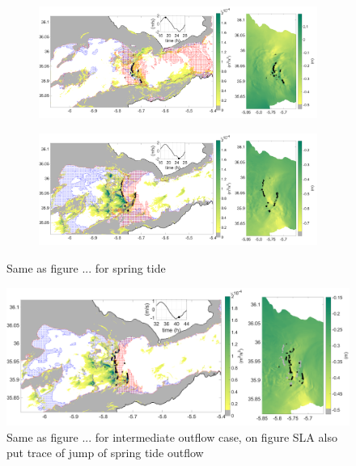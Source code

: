 \begin{figure}[!h]
 \centering
\begin{subfigure}{\linewidth}
\centering
\includegraphics[width=\linewidth]{./GBR3D/VE2_18h30_p.png}
\end{subfigure}

\begin{subfigure}{\linewidth}
\centering
\includegraphics[width=\linewidth]{./GBR3D/VE2_25h_p.png}
\end{subfigure}
\caption {Same as figure ... for spring tide}
\end{figure}

\begin{figure}[!h]
 \centering
\includegraphics[width=\linewidth]{./GBR3D/IES_41h_p.png}
 \caption {Same as figure ... for intermediate outflow case, on figure SLA also put trace of jump of spring tide outflow}
\end{figure}




